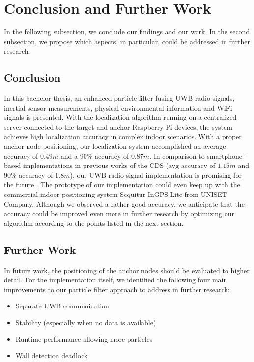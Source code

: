 
\chapter{Conclusion and Further Work} %

\label{Chapter6} %
In the following subsection, we conclude our findings and our work. In the second subsection, we propose which aspects, in particular, could be addressed in further research. 


\section{Conclusion}
In this bachelor thesis, an enhanced particle filter fusing UWB radio signals, inertial sensor measurements, physical environmental information and WiFi signals is presented. With the localization algorithm running on a centralized server connected to the target and anchor Raspberry Pi devices, the system achieves high localization accuracy in complex indoor scenarios. With a proper anchor node positioning, our localization system accomplished an average accuracy of $0.49m$ and a 90\% accuracy of $0.87m$. In comparison to smartphone-based implementations in previous works of the CDS (avg accuracy of $1.15m$ and 90\% accuracy of $1.8m$), our UWB radio signal implementation is promising for the future \cite{Carrera}. The prototype of our implementation could even keep up with the commercial indoor positioning system Sequitur InGPS Lite from UNISET Company. Although we observed a rather good accuracy, we anticipate that the accuracy could be improved even more in further research by optimizing our algorithm according to the points listed in the next section.



\section{Further Work}
In future work, the positioning of the anchor nodes should be evaluated to higher detail. For the implementation itself, we identified the following four main improvements to our particle filter approach to address in further research:
\begin{itemize}
\item Separate UWB communication
\item Stability (especially when no data is available)
\item Runtime performance allowing more particles
\item Wall detection deadlock
\end{itemize}


